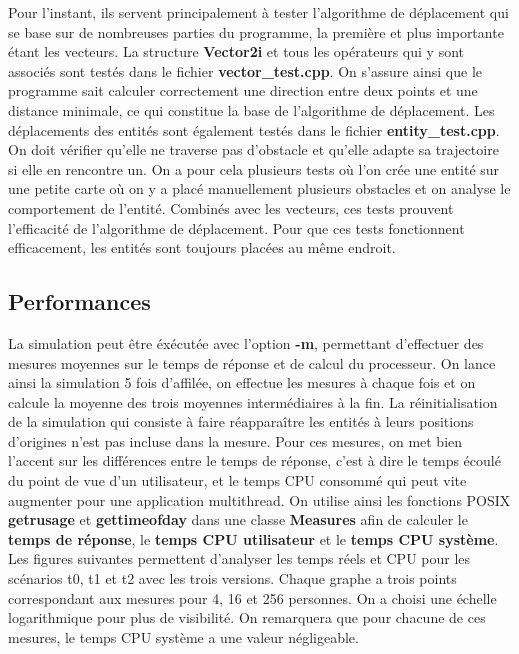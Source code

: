 \documentclass[11pt]{article} %
\begin{document}
Pour l'instant, ils servent principalement à tester l'algorithme de déplacement qui se base sur de nombreuses parties du programme, la première et plus importante étant les vecteurs. La structure \textbf{Vector2i} et tous les opérateurs qui y sont associés sont testés dans le fichier \textbf{vector\_test.cpp}. On s'assure ainsi que le programme sait calculer correctement une direction entre deux points et une distance minimale, ce qui constitue la base de l'algorithme de déplacement. 
Les déplacements des entités sont également testés dans le fichier \textbf{entity\_test.cpp}. On doit vérifier qu'elle ne traverse pas d'obstacle et qu'elle adapte sa trajectoire si elle en rencontre un. On a pour cela plusieurs tests où l'on crée une entité sur une petite carte où on y a placé manuellement plusieurs obstacles et on analyse le comportement de l'entité. Combinés avec les vecteurs, ces tests prouvent l'efficacité de l'algorithme de déplacement. Pour que ces tests fonctionnent efficacement, les entités sont toujours placées au même endroit.

\subsection{Performances}
La simulation peut être éxécutée avec l'option \textbf{-m}, permettant d'effectuer des mesures moyennes sur le temps de réponse et de calcul du processeur. On lance ainsi la simulation 5 fois d'affilée, on effectue les mesures à chaque fois et on calcule la moyenne des trois moyennes intermédiaires à la fin. La réinitialisation de la simulation qui consiste à faire réapparaître les entités à leurs positions d'origines n'est pas incluse dans la mesure. Pour ces mesures, on met bien l'accent sur les différences entre le temps de réponse, c'est à dire le temps écoulé du point de vue d'un utilisateur, et le temps CPU consommé qui peut vite augmenter pour une application multithread. On utilise ainsi les fonctions POSIX \textbf{getrusage} et \textbf{gettimeofday} dans une classe \textbf{Measures} afin de calculer le \textbf{temps de réponse}, le \textbf{temps CPU utilisateur} et le \textbf{temps CPU système}. Les figures suivantes permettent d'analyser les temps réels et CPU pour les scénarios t0, t1 et t2 avec les trois versions. Chaque graphe a trois points correspondant aux mesures pour 4, 16 et 256 personnes. On a choisi une échelle logarithmique pour plus de visibilité.
On remarquera que pour chacune de ces mesures, le temps CPU système a une valeur négligeable.
\end{document}
